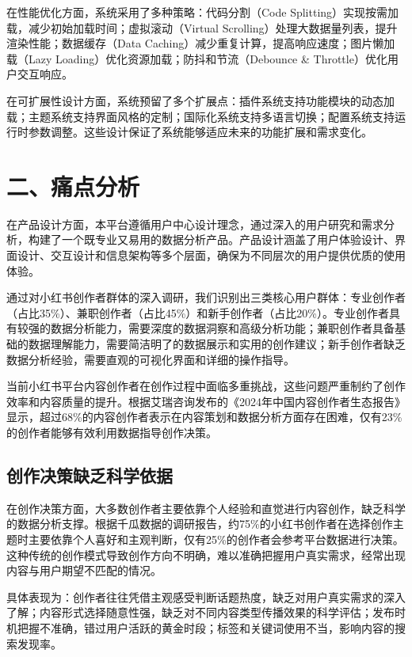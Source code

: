\documentclass[12pt,a4paper]{article}
\begin{document}
在性能优化方面，系统采用了多种策略：代码分割（Code Splitting）实现按需加载，减少初始加载时间；虚拟滚动（Virtual Scrolling）处理大数据量列表，提升渲染性能；数据缓存（Data Caching）减少重复计算，提高响应速度；图片懒加载（Lazy Loading）优化资源加载；防抖和节流（Debounce \& Throttle）优化用户交互响应。

在可扩展性设计方面，系统预留了多个扩展点：插件系统支持功能模块的动态加载；主题系统支持界面风格的定制；国际化系统支持多语言切换；配置系统支持运行时参数调整。这些设计保证了系统能够适应未来的功能扩展和需求变化。

\section*{二、痛点分析}
\setcounter{section}{2}

在产品设计方面，本平台遵循用户中心设计理念，通过深入的用户研究和需求分析，构建了一个既专业又易用的数据分析产品。产品设计涵盖了用户体验设计、界面设计、交互设计和信息架构等多个层面，确保为不同层次的用户提供优质的使用体验。

通过对小红书创作者群体的深入调研，我们识别出三类核心用户群体：专业创作者（占比35\%）、兼职创作者（占比45\%）和新手创作者（占比20\%）。专业创作者具有较强的数据分析能力，需要深度的数据洞察和高级分析功能；兼职创作者具备基础的数据理解能力，需要简洁明了的数据展示和实用的创作建议；新手创作者缺乏数据分析经验，需要直观的可视化界面和详细的操作指导。

当前小红书平台内容创作者在创作过程中面临多重挑战，这些问题严重制约了创作效率和内容质量的提升。根据艾瑞咨询发布的《2024年中国内容创作者生态报告》\cite{content-creator-report}显示，超过68\%的内容创作者表示在内容策划和数据分析方面存在困难，仅有23\%的创作者能够有效利用数据指导创作决策。

\subsection{创作决策缺乏科学依据}

在创作决策方面，大多数创作者主要依靠个人经验和直觉进行内容创作，缺乏科学的数据分析支撑。根据千瓜数据的调研报告，约75\%的小红书创作者在选择创作主题时主要依靠个人喜好和主观判断，仅有25\%的创作者会参考平台数据进行决策。这种传统的创作模式导致创作方向不明确，难以准确把握用户真实需求，经常出现内容与用户期望不匹配的情况。

具体表现为：创作者往往凭借主观感受判断话题热度，缺乏对用户真实需求的深入了解；内容形式选择随意性强，缺乏对不同内容类型传播效果的科学评估；发布时机把握不准确，错过用户活跃的黄金时段；标签和关键词使用不当，影响内容的搜索发现率。
\end{document}
